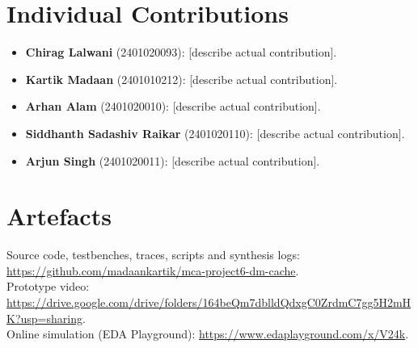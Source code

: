 \documentclass[conference]{IEEEtran}
\begin{document}
\section*{Individual Contributions}
\begin{itemize}
  \item \textbf{Chirag Lalwani} (2401020093): [describe actual contribution].
  \item \textbf{Kartik Madaan} (2401010212): [describe actual contribution].
  \item \textbf{Arhan Alam} (2401020010): [describe actual contribution].
  \item \textbf{Siddhanth Sadashiv Raikar} (2401020110): [describe actual contribution].
  \item \textbf{Arjun Singh} (2401020011): [describe actual contribution].
\end{itemize}

\section*{Artefacts}
Source code, testbenches, traces, scripts and synthesis logs:
\url{https://github.com/madaankartik/mca-project6-dm-cache}.\\
Prototype video: \url{https://drive.google.com/drive/folders/164beQm7dblldQdxgC0ZrdmC7gg5H2mHK?usp=sharing}.\\
Online simulation (EDA Playground): \url{https://www.edaplayground.com/x/V24k}.
\end{document}

